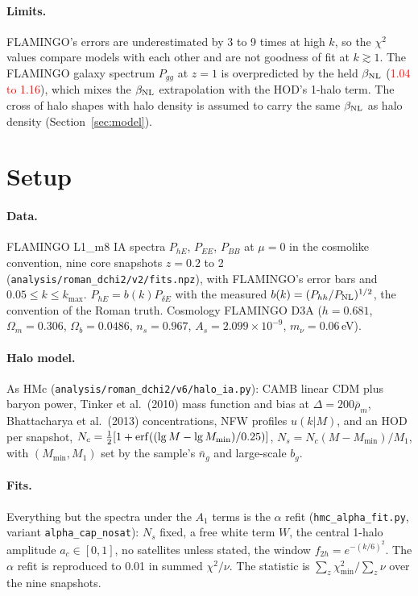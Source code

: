 \documentclass[11pt]{article}
\newcommand{\PNL}{P_{\rm NL}}
\newcommand{\bNL}{\beta_{\rm NL}}
\newcommand{\kmax}{k_{\max}}
\newcommand{\nbar}{\bar n}
\newif\ifnumbersfinal
\newcommand{\refresh}[1]{\ifnumbersfinal#1\else\textcolor{red}{#1}\fi}
\newcommand{\PggNlbZone}{\refresh{1.04 to 1.16}}
\begin{document}
\paragraph{Limits.} FLAMINGO's errors are underestimated by 3 to 9 times at
high $k$, so the $\chi^2$ values compare models with each other and are not
goodness of fit at $k \gtrsim 1$. The FLAMINGO galaxy spectrum $P_{gg}$ at
$z = 1$ is overpredicted by the held $\bNL$ (\PggNlbZone{}), which mixes the
$\bNL$ extrapolation with the HOD's 1-halo term. The cross of halo shapes with
halo density is assumed to carry the same $\bNL$ as halo density
(Section~\ref{sec:model}).

\section{Setup}
\label{sec:setup}

\paragraph{Data.} FLAMINGO L1\_m8 IA spectra $P_{hE}$, $P_{EE}$, $P_{BB}$ at
$\mu = 0$ in the cosmolike convention, nine core snapshots $z = 0.2$ to 2
(\texttt{analysis/roman\_dchi2/v2/fits.npz}), with FLAMINGO's error bars and
$0.05 \le k \le \kmax$. $P_{hE} = b(k)P_{\delta E}$ with the measured
$b(k) = (P_{hh}/\PNL)^{1/2}$, the convention of the Roman truth. Cosmology
FLAMINGO D3A ($h = 0.681$, $\Omega_m = 0.306$, $\Omega_b = 0.0486$,
$n_s = 0.967$, $A_s = 2.099\times10^{-9}$, $m_\nu = 0.06$\,eV).

\paragraph{Halo model.} As HMc (\texttt{analysis/roman\_dchi2/v6/halo\_ia.py}):
CAMB linear CDM plus baryon power, Tinker et al.\ (2010) mass function and
bias at $\Delta = 200\bar\rho_m$, Bhattacharya et al.\ (2013) concentrations,
NFW profiles $u(k|M)$, and an HOD per snapshot,
$N_c = \tfrac12[1 + {\rm erf}((\lg M - \lg M_{\min})/0.25)]$,
$N_s = N_c(M - M_{\min})/M_1$, with $(M_{\min}, M_1)$ set by the sample's
$\nbar_g$ and large-scale $b_g$.

\paragraph{Fits.} Everything but the spectra under the $A_1$ terms is the
$\alpha$ refit (\texttt{hmc\_alpha\_fit.py}, variant
\texttt{alpha\_cap\_nosat}): $N_s$ fixed, a free white term $W$, the central
1-halo amplitude $a_c \in [0, 1]$, no satellites unless stated, the window
$f_{2h} = e^{-(k/6)^2}$. The $\alpha$ refit is reproduced to 0.01 in summed
$\chi^2/\nu$. The statistic is $\sum_z\chi^2_{\min}/\sum_z\nu$ over the nine
snapshots.
\end{document}
